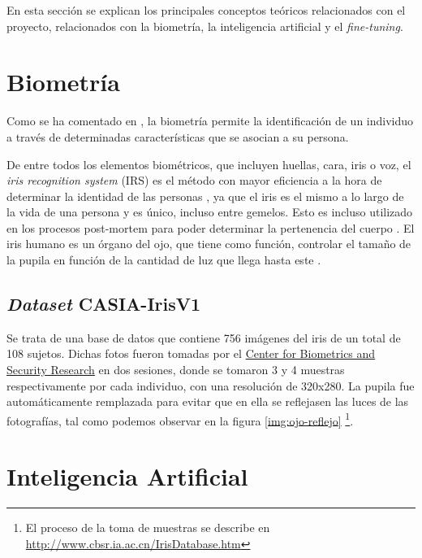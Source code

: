  \label{capitulo3}

En esta sección se explican los principales conceptos teóricos relacionados con el proyecto, relacionados con la biometría, la inteligencia
 artificial y el \textit{fine-tuning}.


\section{Biometría}

Como se ha comentado en , la biometría permite la identificación de un individuo a través de determinadas características que 
se asocian a su persona. 

De entre todos los elementos biométricos, que incluyen huellas, cara, iris o voz, el \textit{iris recognition system} (IRS) es el método con mayor eficiencia a la hora de determinar la identidad
de las personas \cite{malgheet_iris_2021}, ya que el iris es el mismo a lo largo de la vida de una persona y es único, incluso entre gemelos. Esto es incluso utilizado en los procesos 
post-mortem para poder determinar la pertenencia del cuerpo \cite{boyd_post-mortem_2020}. El iris humano es un órgano del ojo, que tiene como función, controlar el tamaño
de la pupila en función de la cantidad de luz que llega hasta este \cite{boyd_post-mortem_2020}.

\subsection{\textit{Dataset} CASIA-IrisV1 }	\label{casia}

Se trata de una base de datos que contiene 756 imágenes del iris de un total de 108 sujetos. 
Dichas fotos fueron tomadas por el \href{http://www.cbsr.ia.ac.cn/english/index.asp}{Center for Biometrics and Security Research} en dos sesiones, donde se tomaron 3 y 4 muestras respectivamente por cada individuo, con una resolución de 320x280. 
La pupila fue automáticamente remplazada para evitar que en ella se reflejasen las luces de las fotografías, tal como podemos observar en la figura \ref{img:ojo-reflejo} 
\footnote{El proceso de la toma de muestras se describe en \url{http://www.cbsr.ia.ac.cn/IrisDatabase.htm}}.

\section{Inteligencia Artificial}

